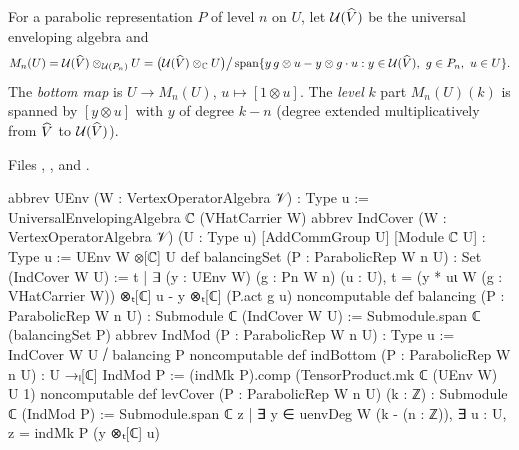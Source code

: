 \begin{definition}\label{l13:def:indmod}
For a parabolic representation $P$ of level $n$ on $U$, let $\mathcal{U}(\widehat{V})$ be the universal enveloping algebra
and
\begin{equation*}
 M_n(U) = \mathcal{U}(\widehat{V})\otimes_{\mathcal{U}(P_n)}U
 = \bigl(\mathcal{U}(\widehat{V})\otimes_{\mathbb{C}} U\bigr)\big/\operatorname{span}\{y\,g\otimes u - y\otimes g\cdot u :
 y\in\mathcal{U}(\widehat{V}),\ g\in P_n,\ u\in U\}.
\end{equation*}
The \emph{bottom map} is $U\to M_n(U)$, $u\mapsto[1\otimes u]$. The \emph{level} $k$ part $M_n(U)(k)$ is spanned by
$[y\otimes u]$ with $y$ of degree $k-n$ (degree extended multiplicatively from $\widehat{V}$ to $\mathcal{U}(\widehat{V})$).
\end{definition}
\noindent Files ,
,
 and
.
\begin{leancode}
abbrev UEnv (W : VertexOperatorAlgebra 𝒱) : Type u :=
  UniversalEnvelopingAlgebra ℂ (VHatCarrier W)
abbrev IndCover (W : VertexOperatorAlgebra 𝒱) (U : Type u) [AddCommGroup U] [Module ℂ U] :
    Type u := UEnv W ⊗[ℂ] U
def balancingSet (P : ParabolicRep W n U) : Set (IndCover W U) :=
  {t | ∃ (y : UEnv W) (g : Pn W n) (u : U),
    t = (y * uι W (g : VHatCarrier W)) ⊗ₜ[ℂ] u - y ⊗ₜ[ℂ] (P.act g u)}
noncomputable def balancing (P : ParabolicRep W n U) : Submodule ℂ (IndCover W U) :=
  Submodule.span ℂ (balancingSet P)
abbrev IndMod (P : ParabolicRep W n U) : Type u := IndCover W U ⧸ balancing P
noncomputable def indBottom (P : ParabolicRep W n U) : U →ₗ[ℂ] IndMod P :=
  (indMk P).comp (TensorProduct.mk ℂ (UEnv W) U 1)
noncomputable def levCover (P : ParabolicRep W n U) (k : ℤ) : Submodule ℂ (IndMod P) :=
  Submodule.span ℂ {z | ∃ y ∈ uenvDeg W (k - (n : ℤ)), ∃ u : U, z = indMk P (y ⊗ₜ[ℂ] u)}
\end{leancode}

